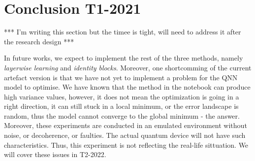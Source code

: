 \section{Conclusion T1-2021}
*** I'm writing this section but the timee is tight, will need to address it after the research design ***

In future works, we expect to implement the rest of the three methods, namely \textit{layerwise learning} and \textit{identity blocks}.
Moreover, one shortcomming of the current artefact version is that we have not yet to implement a problem for the QNN model to optimise.
We have known that the method in the notebook can produce high variance values, however, it does not mean the optimization is going in a right direction, it can still stuck in a local minimum, or the error landscape is random, thus the model cannot converge to the global minimum - the answer.
Moreover, these experiments are conducted in an emulated environment without noise, or decoherence, or faulties.
The actual quantum device will not have such characteristics.
Thus, this experiment is not reflecting the real-life sittuation.
We will cover these issues in T2-2022.